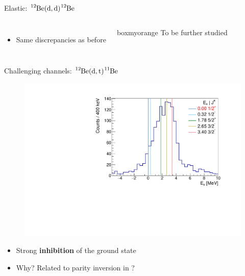 \documentclass[sans,
frameno, %
mp,
usenames,dvipsnames, %
onlytextwidth, %
t,%
11pt]{beamer}
\newcommand{\iso}[2]{\ce{^{#1}#2}}
\begin{document}
\begin{frame}{Elastic: $\iso{12}{Be}(\textrm{d}, \textrm{d})\iso{12}{Be}$}
{\begin{figure}
\begin{minipage}[t]{0.48\linewidth}
            \end{minipage}
        \end{figure}
        \begin{columns}
            {
                \begin{itemize}
                    \item Same discrepancies as before
                \end{itemize}
            }\hfill
            {

                \begin{beamercolorbox}[sep=1ex, center, rounded=true]{boxmyorange}
                    To be further studied \\
                \end{beamercolorbox}

            }
        \end{columns}
    }
\end{frame}

\begin{frame}{Challenging channels: $\iso{12}{Be}(\textrm{d}, \textrm{t})\iso{11}{Be}$}
    \begin{figure}
        \centering
        \includegraphics[width=0.6\linewidth]{figures/Workshop/12Be_dt_ex.pdf}
    \end{figure}
    \medskip
    \begin{itemize}
        \item Strong \textbf{inhibition} of the ground state
        \item Why? Related to parity inversion in \iso{11}{Be}?
    \end{itemize}
\end{frame}
\end{document}
